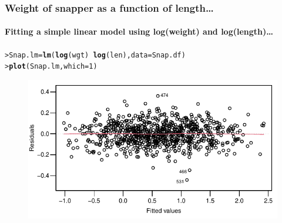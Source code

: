 \documentclass{beamer}\usepackage[]{graphicx}\usepackage[]{xcolor}
\makeatletter
\newcommand{\hlnum}[1]{\textcolor[rgb]{0.686,0.059,0.569}{#1}}%
\newcommand{\hlopt}[1]{\textcolor[rgb]{0,0,0}{#1}}%
\newcommand{\hlstd}[1]{\textcolor[rgb]{0.345,0.345,0.345}{#1}}%
\newcommand{\hlkwb}[1]{\textcolor[rgb]{0.69,0.353,0.396}{#1}}%
\newcommand{\hlkwc}[1]{\textcolor[rgb]{0.333,0.667,0.333}{#1}}%
\newcommand{\hlkwd}[1]{\textcolor[rgb]{0.737,0.353,0.396}{\textbf{#1}}}%
\newenvironment{kframe}{%
 \def\at@end@of@kframe{}%
 \ifinner\ifhmode%
  \def\at@end@of@kframe{\end{minipage}}%
  \begin{minipage}{\columnwidth}%
 \fi\fi%
 \def\FrameCommand##1{\hskip\@totalleftmargin \hskip-\fboxsep
 \colorbox{shadecolor}{##1}\hskip-\fboxsep
     \hskip-\linewidth \hskip-\@totalleftmargin \hskip\columnwidth}%
 \MakeFramed {\advance\hsize-\width
   \@totalleftmargin\z@ \linewidth\hsize
   \@setminipage}}%
 {\par\unskip\endMakeFramed%
 \at@end@of@kframe}
\newenvironment{knitrout}{}{} %
\makeatother
\begin{document}
\begin{frame}[fragile]
\frametitle{Weight of snapper as a function of length\ldots}
\framesubtitle{Fitting a simple linear model using log(weight) and log(length)\ldots}

\begin{knitrout}\scriptsize
{}\color{fgcolor}\begin{kframe}
\begin{alltt}
\hlstd{> }\hlstd{Snap.lm}\hlkwb{=}\hlkwd{lm}\hlstd{(}\hlkwd{log}\hlstd{(wgt)}\hlopt{~}\hlkwd{log}\hlstd{(len),}\hlkwc{data}\hlstd{=Snap.df)}
\hlstd{> }\hlkwd{plot}\hlstd{(Snap.lm,}\hlkwc{which}\hlstd{=}\hlnum{1}\hlstd{)}
\end{alltt}
\end{kframe}
\end{knitrout}



\begin{figure}
  \centering
  \includegraphics{figure/RC-H07-006}
\end{figure}

\end{frame}
\end{document}
